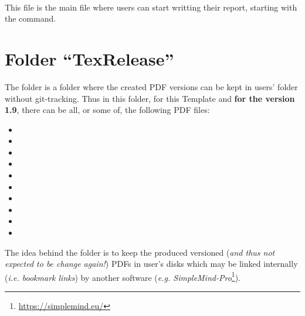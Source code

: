 \begin{description}
\item{\textbf{}} \hfill \\
This file is the main file where users can start writting their report, starting with the \codemr{\\chapter\{\}} command.
\end{description}

\newpage
\section{Folder ``TexRelease''}
The folder  is a folder where the created PDF versions can be kept in users' folder without git-tracking. Thus in this folder, for this Template and \textbf{for the version 1.9}, there can be all, or some of, the following PDF files:
\begin{itemize}
\setlength\itemsep{0em}
\item{}
\item{}
\item{}
\item{}
\item{}
\item{}
\item{}
\item{}
\item{}
\item{}
\end{itemize}

The idea behind the folder  is to keep the produced versioned  (\textit{and thus not expected to be change again!}) PDFs in user's disks which may be linked internally (\textit{i.e. bookmark links}) by another software (\textit{e.g. SimpleMind-Pro}\footnote{\href{https://simplemind.eu/}{https://simplemind.eu/}}).

\newpage
